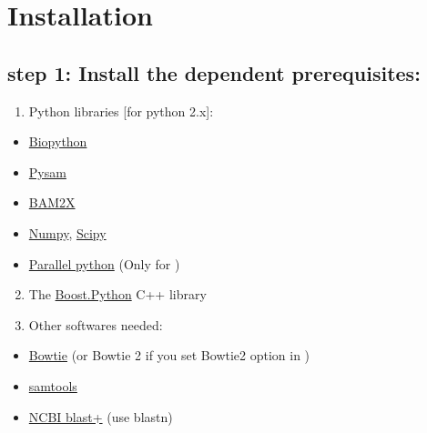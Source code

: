 \documentclass[letterpaper,10pt,english]{sphinxmanual}
\begin{document}
\section{Installation}
\label{RNA-Hi-C-tools:installation}

\subsection{step 1: Install the dependent prerequisites:}
\label{RNA-Hi-C-tools:step-1-install-the-dependent-prerequisites}\begin{enumerate}
\item {} 
Python libraries {[}for python 2.x{]}:

\end{enumerate}
\begin{itemize}
\item {} 
\href{http://biopython.org/wiki/Main\_Page}{Biopython}

\item {} 
\href{https://code.google.com/p/pysam/}{Pysam}

\item {} 
\href{http://bam2xwiki.appspot.com/Welcome}{BAM2X}

\item {} 
\href{http://www.numpy.org/}{Numpy}, \href{http://www.scipy.org/scipylib/index.html}{Scipy}

\item {} 
\href{http://www.parallelpython.com/}{Parallel python} (Only for )

\end{itemize}
\begin{enumerate}
\setcounter{enumi}{1}
\item {} 
The \href{http://www.boost.org/doc/libs/1\_54\_0/libs/python/doc/index.html}{Boost.Python} C++ library

\item {} 
Other softwares needed:

\end{enumerate}
\begin{itemize}
\item {} 
\href{http://bowtie-bio.sourceforge.net/index.shtml}{Bowtie} (or Bowtie 2 if you set Bowtie2 option in )

\item {} 
\href{http://samtools.sourceforge.net/}{samtools}

\item {} 
\href{ftp://ftp.ncbi.nlm.nih.gov/blast/executables/blast+/LATEST/}{NCBI blast+} (use blastn)

\end{itemize}
\end{document}
